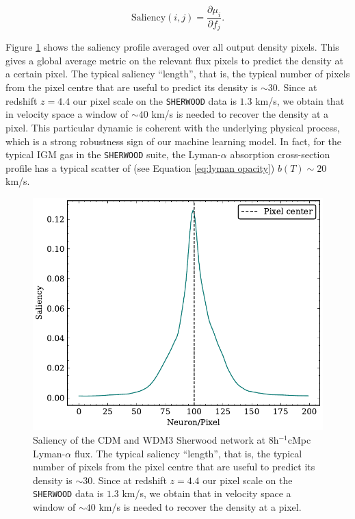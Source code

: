 \begin{equation}
    \text{Saliency}(i,j) = \frac{\partial  \mu_i}{\partial f_j}.
\end{equation}

Figure \ref{fig: saliency} shows the saliency profile averaged over all output density pixels. This gives a global average metric on the relevant flux pixels to predict the density at a certain pixel. The typical saliency ``length'', that is, the typical number of pixels from the pixel centre that are useful to predict its density is $\sim 30$. Since at redshift $z=4.4$ our pixel scale on the \texttt{SHERWOOD} data is $1.3$ km/s, we obtain that in velocity space a window of $\sim 40$ km/s is needed to recover the density at a pixel. This particular dynamic is coherent with the underlying physical process, which is a strong robustness sign of our machine learning model. In fact, for the typical IGM gas in the \texttt{SHERWOOD} suite, the Lyman-$\alpha$ absorption cross-section profile has a typical scatter of (see Equation \ref{eq:lyman opacity}) $ b(T) \sim 20$ km/s.


\begin{figure}
    \centering
    \includegraphics[width=0.6\linewidth]{img/ML/saliency.pdf}
    \caption{Saliency of the CDM and WDM3 Sherwood network at 8h$^{-1}$cMpc Lyman-$\alpha$ flux. The typical saliency ``length'', that is, the typical number of pixels from the pixel centre that are useful to predict its density is $\sim 30$. Since at redshift $z=4.4$ our pixel scale on the \texttt{SHERWOOD} data is $1.3$ km/s, we obtain that in velocity space a window of $\sim 40$ km/s is needed to recover the density at a pixel.}
    \label{fig: saliency}
\end{figure}



